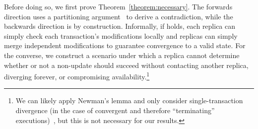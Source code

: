 Before doing so, we first prove Theorem~\ref{theorem:necessary}. The
forwards direction uses a partitioning argument~\cite{gilbert-cap} to
derive a contradiction, while the backwards direction is by
construction. Informally, if \iconfluence holds, each replica can
simply check each transaction's modifications locally and replicas can
simply merge independent modifications to guarantee convergence to a
valid state. For the converse, we construct a scenario under which a
replica cannot determine whether or not a non-\iconfluent update
should succeed without contacting another replica, diverging forever,
or compromising availability.\footnote{We can likely apply Newman's
  lemma and only consider single-transaction divergence (in the case
  of convergent and therefore ``terminating''
  executions)~\cite{obs-confluence,termrewriting}, but this is not
  necessary for our results.}

